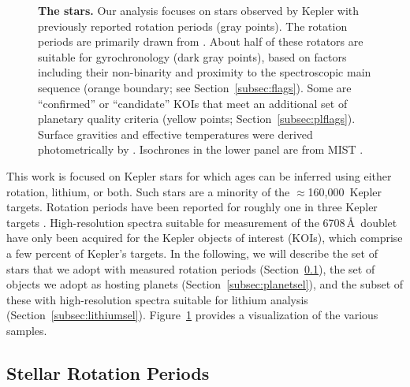 \documentclass[11pt,twocolumn,tighten]{aastex63}
\newcommand{\nkeplerstars}{$\approx$160{,}000}
\begin{document}
\begin{figure}[!t]
	\begin{center}
	
		\vspace{-0.3cm}
	\end{center}
	\vspace{-0.5cm}
  \caption{{\bf The stars.}  Our analysis focuses on stars observed by
  Kepler with previously reported rotation periods (gray points).  The
  rotation periods are primarily drawn from
  \citet{Santos_2019,Santos_2021}.  About half of these rotators are
  suitable for gyrochronology (dark gray points), based on factors
  including their non-binarity and proximity to the spectroscopic main
  sequence (orange boundary; see Section~\ref{subsec:flags}).  Some
  are ``confirmed'' or ``candidate'' KOIs that meet an additional set
  of planetary quality criteria (yellow points;
  Section~\ref{subsec:plflags}).  Surface gravities and effective
  temperatures were derived photometrically by
  \citet{Berger_2020a_catalog}.  Isochrones in the lower panel are
  from MIST \citep{Choi_2016}.
	}
	\label{fig:stellarprops}
\end{figure}

This work is focused on Kepler stars for which ages can be inferred
using either rotation, lithium, or both.  Such stars are a minority of
the \nkeplerstars\ Kepler targets.  Rotation periods have been
reported for roughly one in three Kepler targets
\citep[e.g.][]{McQuillan_2014,Santos_2021}.  High-resolution spectra
suitable for measurement of the  6708\,\AA\ doublet have
only been acquired for the Kepler objects of interest (KOIs), which
comprise a few percent of Kepler's targets.  In the following, we will
describe the set of stars that we adopt with measured rotation periods
(Section~\ref{subsec:rotsel}), the set of objects we adopt as hosting
planets (Section~\ref{subsec:planetsel}), and the subset of these with
high-resolution spectra suitable for lithium analysis
(Section~\ref{subsec:lithiumsel}).  Figure~\ref{fig:stellarprops}
provides a visualization of the various samples.


\subsection{Stellar Rotation Periods}
\label{subsec:rotsel}
\end{document}

